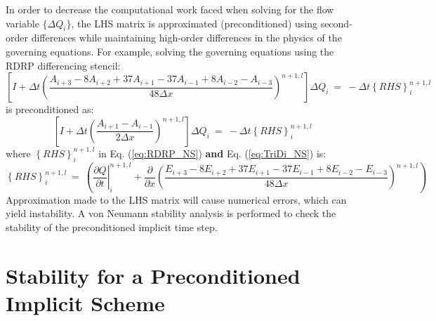 \documentclass[conf]{new-aiaa}
\begin{document}
In order to decrease the computational work faced when solving for the flow variable $\{\Delta{Q}_i\}$, the LHS matrix is approximated (preconditioned) using second-order differences while maintaining high-order differences in the physics of the governing equations. For example, solving the governing equations using the RDRP differencing stencil:
\begin{equation}
	\label{eq:RDRP_NS}
  		\left[I+\Delta{t}\left(\frac{A_{i+3}-8A_{i+2}+37A_{i+1}-37A_{i-1}+8A_{i-2}-A_{i-3}}{48\Delta{x}}\right)^{n+1,l}\right]\Delta{Q}_i~=~-\Delta{t}\left\{RHS\right\}_i^{n+1, l}
\end{equation}
is preconditioned as:
\begin{equation}
	\label{eq:TriDi_NS}
  		\left[I+\Delta{t}\left(\frac{A_{i+1}-A_{i-1}}{2\Delta{x}}\right)^{n+1,l}\right]\Delta{Q}_i~=~-\Delta{t}\left\{RHS\right\}_i^{n+1, l}
\end{equation}
where $\left\{RHS\right\}_i^{n+1, l}$ in Eq. (\ref{eq:RDRP_NS}) \textbf{and} Eq. (\ref{eq:TriDi_NS}) is: 
\begin{equation*}
	\left\{RHS\right\}_i^{n+1, l}~=~\left(\left.\frac{\partial{Q}}{\partial{{t}}}\right|_{i}^{n+1,l}+\frac{\partial}{\partial{x}}\left(\frac{E_{i+3}-8E_{i+2}+37E_{i+1}-37E_{i-1}+8E_{i-2}-E_{i-3}}{48\Delta{x}}\right)^{n+1,l}\right)
\end{equation*}
Approximation made to the LHS matrix will cause numerical errors, which can yield instability. A von Neumann stability analysis is performed to check the stability of the preconditioned implicit time step. 

\section{Stability for a Preconditioned Implicit Scheme}
\label{sec:Stability}
\end{document}

